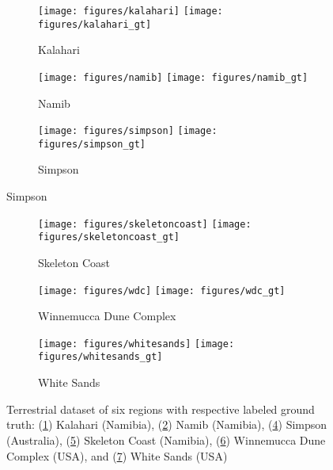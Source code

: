 \begin{figure}
	\centering
	\begin{subfigure}{\textwidth}
		\centering
		\texttt{[image: figures/kalahari]}
		\texttt{[image: figures/kalahari\_gt]}
		\caption{ Kalahari }
		\label{fig:kalahari_image}
	\end{subfigure}
	\begin{subfigure}{\textwidth}
		\centering
		\texttt{[image: figures/namib]}
		\texttt{[image: figures/namib\_gt]}
		\caption{ Namib }
		\label{fig:namib_image}
	\end{subfigure}
	\begin{subfigure}{\textwidth}
		\centering
		\texttt{[image: figures/simpson]}
		\texttt{[image: figures/simpson\_gt]}
		\caption{ Simpson}
		\label{fig:simpson_image}
	\end{subfigure}
\end{figure}
\begin{figure}
	\ContinuedFloat
	\centering
	\begin{subfigure}{\textwidth}
		\centering
		\texttt{[image: figures/skeletoncoast]}
		\texttt{[image: figures/skeletoncoast\_gt]}
		\caption{ Skeleton Coast}
		\label{fig:skeleton_coast_image}
	\end{subfigure}
	\begin{subfigure}{\textwidth}
		\centering
		\texttt{[image: figures/wdc]}
		\texttt{[image: figures/wdc\_gt]}
		\caption{ Winnemucca Dune Complex }
		\label{fig:wdc_image}
	\end{subfigure}
	\begin{subfigure}{\textwidth}
		\centering
		\texttt{[image: figures/whitesands]}
		\texttt{[image: figures/whitesands\_gt]}
		\caption{ White Sands }
		\label{fig:white_sands_image}
	\end{subfigure}
	\caption{Terrestrial dataset of six regions with respective labeled ground truth: (\ref{fig:kalahari_image}) Kalahari (Namibia), (\ref{fig:namib_image}) Namib (Namibia), (\ref{fig:simpson_image}) Simpson (Australia), (\ref{fig:skeleton_coast_image}) Skeleton Coast (Namibia), (\ref{fig:wdc_image}) Winnemucca Dune Complex (USA), and (\ref{fig:white_sands_image}) White Sands (USA)}
	\label{fig:terrestrial_dataset}
\end{figure}


